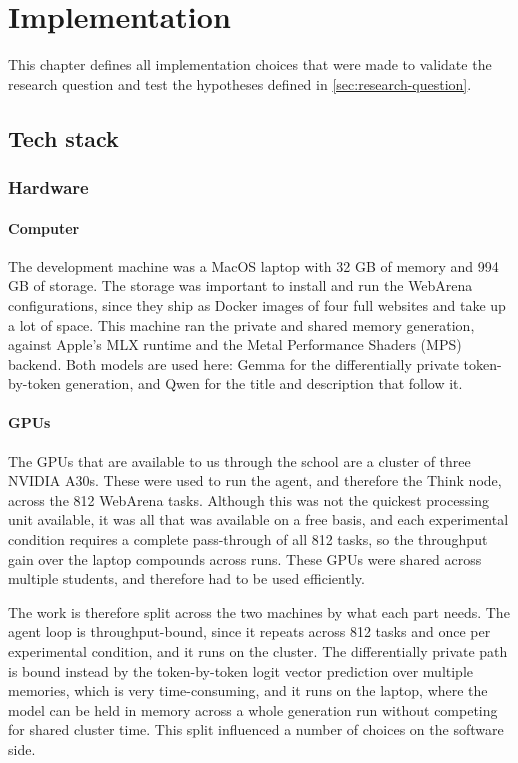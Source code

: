 \chapter{Implementation}\label{ch:implementation}

This chapter defines all implementation choices that were made to validate the research question and test the hypotheses defined in \ref{sec:research-question}.

\section{Tech stack}
\subsection{Hardware}
\subsubsection{Computer}
The development machine was a MacOS laptop with 32 GB of memory and 994 GB of storage. The storage was important to install and run the WebArena configurations, since they ship as Docker images of four full websites and take up a lot of space. This machine ran the private and shared memory generation, against Apple's MLX runtime and the Metal Performance Shaders (MPS) backend. Both models are used here: Gemma for the differentially private token-by-token generation, and Qwen for the title and description that follow it.

\subsubsection{GPUs}
The GPUs that are available to us through the school are a cluster of three NVIDIA A30s. These were used to run the agent, and therefore the Think node, across the 812 WebArena tasks. Although this was not the quickest processing unit available, it was all that was available on a free basis, and each experimental condition requires a complete pass-through of all 812 tasks, so the throughput gain over the laptop compounds across runs. These GPUs were shared across multiple students, and therefore had to be used efficiently.

The work is therefore split across the two machines by what each part needs. The agent loop is throughput-bound, since it repeats across 812 tasks and once per experimental condition, and it runs on the cluster. The differentially private path is bound instead by the token-by-token logit vector prediction over multiple memories, which is very time-consuming, and it runs on the laptop, where the model can be held in memory across a whole generation run without competing for shared cluster time. This split influenced a number of choices on the software side.

